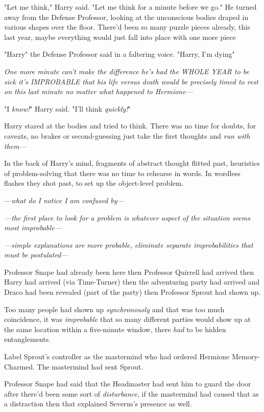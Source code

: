"Let me think," Harry said. "Let me think for a minute before we go." He turned
away from the Defense Professor, looking at the unconscious bodies draped in
various shapes over the floor. There'd been so many puzzle pieces already, this
last year, maybe everything would just fall into place with one more
piece{\el}

"Harry{\el}" the Defense Professor said in a faltering voice. "Harry, I'm
dying{\el}"

\emph{One more minute can't make the difference he's had the WHOLE YEAR to be
sick it's IMPROBABLE that his life versus death would be precisely timed to
rest on this last minute no matter what happened to Hermione—}

"I \emph{know!}" Harry said. "I'll think \emph{quickly!}"

Harry stared at the bodies and tried to think. There was no time for doubts,
for caveats, no brakes or second-guessing just take the first thoughts and
\emph{run with them—}

In the back of Harry's mind, fragments of abstract thought flitted past,
heuristics of problem-solving that there was no time to rehearse in words. In
wordless flashes they shot past, to set up the object-level problem.

—\emph{what do I notice I am confused by—}

\emph{—the first place to look for a problem is whatever aspect of the
situation seems most improbable—}

\emph{—simple explanations are more probable, eliminate separate
improbabilities that must be postulated—}

Professor Snape had already been here then Professor Quirrell had arrived then
Harry had arrived (via Time-Turner) then the adventuring party had arrived and
Draco had been revealed (part of the party) then Professor Sprout had shown up.

Too many people had shown up \emph{synchronously} and that was too much
coincidence, it was \emph{improbable} that so many different parties would show
up at the same location within a five-minute window, there \emph{had} to be
hidden entanglements.

Label Sprout's controller as the mastermind who had ordered Hermione
Memory-Charmed. The mastermind had sent Sprout.

Professor Snape had said that the Headmaster had sent him to guard the door
after there'd been some sort of \emph{disturbance}, if the mastermind had
caused that as a distraction then that explained Severus's presence as well.

